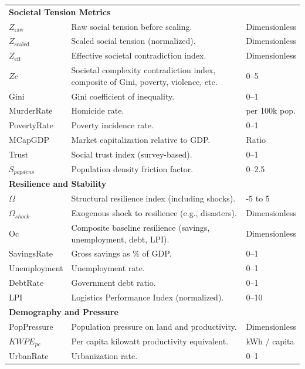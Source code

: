 \documentclass[12pt,a4paper]{article}
\begin{document}
\begin{longtable}{p{3cm} p{9cm} p{3cm}}
\multicolumn{3}{l}{\textbf{Societal Tension Metrics}} \\
$Z_{\mathrm{raw}}$    & Raw social tension before scaling. & Dimensionless \\
$Z_{\mathrm{scaled}}$ & Scaled social tension (normalized). & Dimensionless \\
$Z_{\mathrm{eff}}$    & Effective societal contradiction index. & Dimensionless \\
$Zc$                  & Societal complexity contradiction index, composite of Gini, poverty, violence, etc. & 0–5 \\
Gini                  & Gini coefficient of inequality. & 0–1 \\
MurderRate            & Homicide rate. & per 100k pop. \\
PovertyRate           & Poverty incidence rate. & 0–1 \\
MCapGDP               & Market capitalization relative to GDP. & Ratio \\
Trust                 & Social trust index (survey-based). & 0–1 \\
$S_{popdens}$         & Population density friction factor. & 0–2.5 \\

\multicolumn{3}{l}{\textbf{Resilience and Stability}} \\
$\Omega$              & Structural resilience index (including shocks). & -5 to 5 \\
$\Omega_{shock}$      & Exogenous shock to resilience (e.g., disasters). & Dimensionless \\
Oc                    & Composite baseline resilience (savings, unemployment, debt, LPI). & Dimensionless \\
SavingsRate           & Gross savings as \% of GDP. & 0–1 \\
Unemployment          & Unemployment rate. & 0–1 \\
DebtRate              & Government debt ratio. & 0–1 \\
LPI                   & Logistics Performance Index (normalized). & 0–10 \\

\multicolumn{3}{l}{\textbf{Demography and Pressure}} \\
PopPressure           & Population pressure on land and productivity. & Dimensionless \\
$KWPE_{pc}$           & Per capita kilowatt productivity equivalent. & kWh / capita \\
UrbanRate             & Urbanization rate. & 0–1 \\


\end{longtable}
\end{document}
